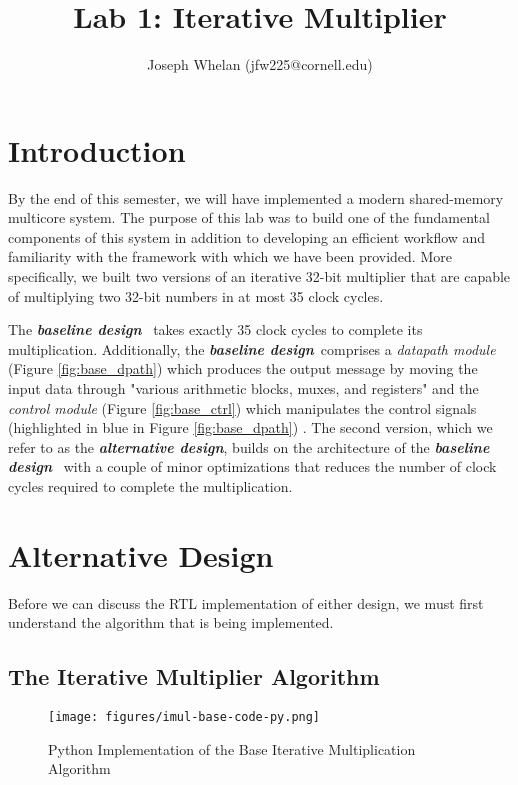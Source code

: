 \documentclass[10pt]{article}
\title{Lab 1: Iterative Multiplier}
\author{Joseph Whelan (jfw225@cornell.edu)}
\newcommand{\baseline}[0]{\textit{\textbf{baseline design}}}
\newcommand{\alternative}[0]{\textit{\textbf{alternative design}}}
\begin{document}
 
	
	\maketitle
	
	\section{Introduction}
	\label{sec:introduction}

	By the end of this semester, we will have implemented a modern shared-memory multicore system. The purpose of this lab was to build one of the fundamental components of this system in addition to developing an efficient workflow and familiarity with the framework with which we have been provided. More specifically, we built two versions of an iterative 32-bit multiplier that are capable of multiplying two 32-bit numbers in at most 35 clock cycles. 
	
	The \baseline~ takes exactly 35 clock cycles to complete its multiplication. Additionally, the \baseline ~comprises a \textit{datapath module} (Figure \ref{fig:base_dpath}) which produces the output message by moving the input data through "various arithmetic blocks, muxes, and registers" and the \textit{control module} (Figure \ref{fig:base_ctrl}) which manipulates the control signals (highlighted in blue in Figure \ref{fig:base_dpath}) \citep*{lab_handout}. The second version, which we refer to as the \alternative, builds on the architecture of the \baseline~ with a couple of minor optimizations that reduces the number of clock cycles required to complete the multiplication. 
	
	\section{Alternative Design}
	\label{sec:alt_design}

	\noindent Before we can discuss the RTL implementation of either design, we must first understand the algorithm that is being implemented.

	\subsection{The Iterative Multiplier Algorithm}
	\label{sec:imul_algo}

	\begin{wrapfigure}{r}{7.5cm}
		\texttt{[image: figures/imul-base-code-py.png]} 
		\caption{Python Implementation of the Base Iterative Multiplication Algorithm}
		\label{fig:base_code_py}
	\end{wrapfigure} 
\end{document}
